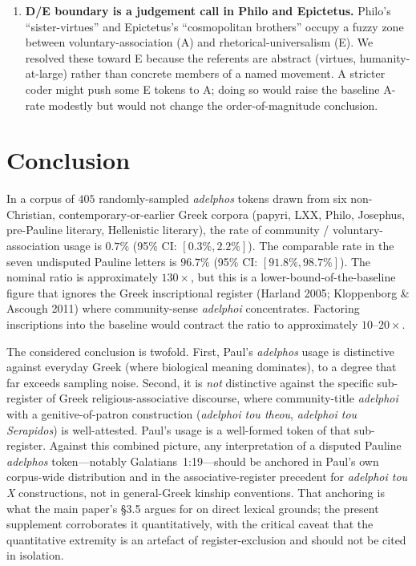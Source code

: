 \documentclass[11pt,oneside]{article}
\begin{document}
\begin{enumerate}[leftmargin=1.5em]
  An alternative aggregate could weight by estimated volume of Greek
  Paul would have encountered (heavier on papyri and LXX, lighter on
  Plutarch).  Equal weighting across the six buckets gives each
  register equal voice in the aggregate; register-proportional
  weighting would likely push the aggregate A-rate even lower,
  because the register with the largest corpus volume (papyri) has
  0\% A.
\item \textbf{D/E boundary is a judgement call in Philo and Epictetus.}
  Philo's \enquote{sister-virtues} and Epictetus's \enquote{cosmopolitan
  brothers} occupy a fuzzy zone between voluntary-association (A) and
  rhetorical-universalism (E).  We resolved these toward E because the
  referents are abstract (virtues, humanity-at-large) rather than
  concrete members of a named movement.  A stricter coder might push
  some E tokens to A; doing so would raise the baseline A-rate
  modestly but would not change the order-of-magnitude conclusion.
\end{enumerate}

\section*{Conclusion}

In a corpus of $405$ randomly-sampled \textit{adelphos} tokens drawn
from six non-Christian, contemporary-or-earlier Greek corpora (papyri,
LXX, Philo, Josephus, pre-Pauline literary, Hellenistic literary), the
rate of community / voluntary-association usage is $0.7\%$ (95\% CI:
$[0.3\%, 2.2\%]$).  The comparable rate in the seven undisputed Pauline
letters is $96.7\%$ (95\% CI: $[91.8\%, 98.7\%]$).  The nominal ratio
is approximately $130\times$, but this is a lower-bound-of-the-baseline
figure that ignores the Greek inscriptional register
(Harland 2005; Kloppenborg \& Ascough 2011) where community-sense
\textit{adelphoi} concentrates.  Factoring inscriptions into the
baseline would contract the ratio to approximately $10$--$20\times$.

The considered conclusion is twofold.  First, Paul's \textit{adelphos}
usage is distinctive against everyday Greek (where biological meaning
dominates), to a degree that far exceeds sampling noise.  Second, it
is \textit{not} distinctive against the specific sub-register of Greek
religious-associative discourse, where community-title \textit{adelphoi}
with a genitive-of-patron construction (\textit{adelphoi tou theou},
\textit{adelphoi tou Serapidos}) is well-attested.  Paul's usage is
a well-formed token of that sub-register.  Against this combined
picture, any interpretation of a disputed Pauline \textit{adelphos}
token---notably Galatians~1:19---should be anchored in Paul's own
corpus-wide distribution and in the associative-register precedent
for \textit{adelphoi tou X} constructions, not in general-Greek
kinship conventions.  That anchoring is what the main paper's §3.5
argues for on direct lexical grounds; the present supplement
corroborates it quantitatively, with the critical caveat that the
quantitative extremity is an artefact of register-exclusion and should
not be cited in isolation.
\end{document}
